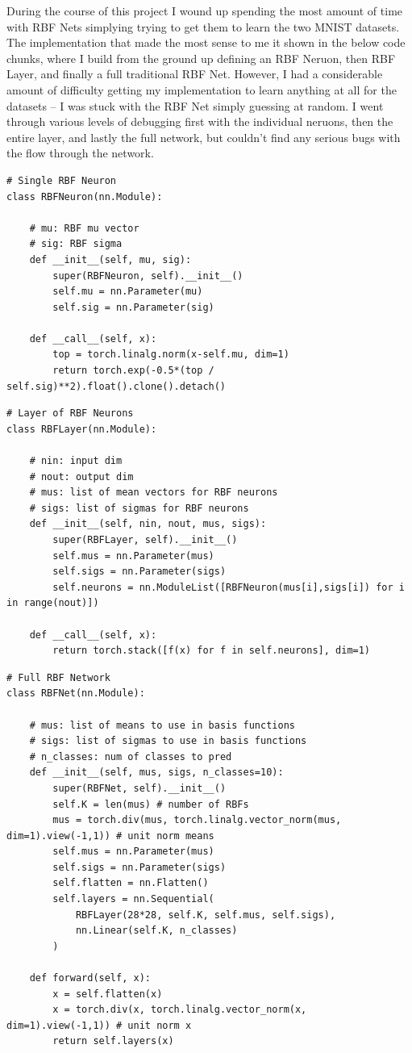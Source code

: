 \documentclass[12pt, twoside]{report}
\begin{document}
During the course of this project I wound up spending the most amount of time with RBF Nets
simplying trying to get them to learn the two MNIST datasets.
The implementation that made the most sense to me it shown in the below code chunks,
where I build from the ground up defining an RBF Neruon, then RBF Layer, and finally a full
traditional RBF Net.
However, I had a considerable amount of difficulty getting my implementation to learn anything at all
for the datasets – I was stuck with the RBF Net simply guessing at random.
I went through various levels of debugging first with the individual neruons,
then the entire layer, and lastly the full network, but couldn't find any serious bugs with the
flow through the network.

\begin{lstlisting}[style=Python,caption=RBF Neuron,label=lst:python]
# Single RBF Neuron
class RBFNeuron(nn.Module):

    # mu: RBF mu vector
    # sig: RBF sigma
    def __init__(self, mu, sig):
        super(RBFNeuron, self).__init__()
        self.mu = nn.Parameter(mu)
        self.sig = nn.Parameter(sig)

    def __call__(self, x):
        top = torch.linalg.norm(x-self.mu, dim=1)
        return torch.exp(-0.5*(top / self.sig)**2).float().clone().detach()
\end{lstlisting}

\begin{lstlisting}[style=Python,caption=RBF Layer,label=lst:python]
# Layer of RBF Neurons
class RBFLayer(nn.Module):

    # nin: input dim
    # nout: output dim
    # mus: list of mean vectors for RBF neurons
    # sigs: list of sigmas for RBF neurons
    def __init__(self, nin, nout, mus, sigs):
        super(RBFLayer, self).__init__()
        self.mus = nn.Parameter(mus)
        self.sigs = nn.Parameter(sigs)
        self.neurons = nn.ModuleList([RBFNeuron(mus[i],sigs[i]) for i in range(nout)])

    def __call__(self, x):
        return torch.stack([f(x) for f in self.neurons], dim=1)
\end{lstlisting}

\begin{lstlisting}[style=Python,caption=RBF Network,label=lst:python]
# Full RBF Network
class RBFNet(nn.Module):

    # mus: list of means to use in basis functions
    # sigs: list of sigmas to use in basis functions
    # n_classes: num of classes to pred
    def __init__(self, mus, sigs, n_classes=10):
        super(RBFNet, self).__init__()
        self.K = len(mus) # number of RBFs
        mus = torch.div(mus, torch.linalg.vector_norm(mus, dim=1).view(-1,1)) # unit norm means
        self.mus = nn.Parameter(mus)
        self.sigs = nn.Parameter(sigs)
        self.flatten = nn.Flatten()
        self.layers = nn.Sequential(
            RBFLayer(28*28, self.K, self.mus, self.sigs),
            nn.Linear(self.K, n_classes)
        )

    def forward(self, x):
        x = self.flatten(x)
        x = torch.div(x, torch.linalg.vector_norm(x, dim=1).view(-1,1)) # unit norm x
        return self.layers(x)
\end{lstlisting}
\end{document}
